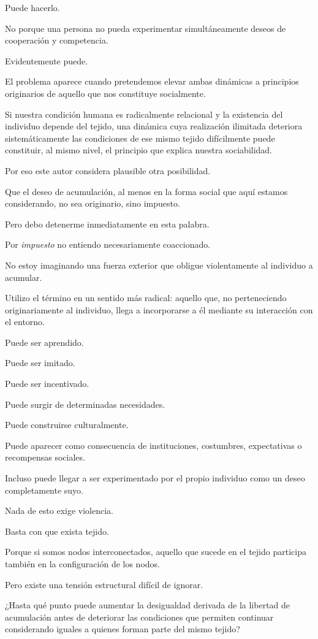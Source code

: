 \documentclass[12pt,a4paper]{article}
\begin{document}
Puede hacerlo.

No porque una persona no pueda experimentar simultáneamente deseos de cooperación y competencia.

Evidentemente puede.

El problema aparece cuando pretendemos elevar ambas dinámicas a principios originarios de aquello que nos constituye socialmente.

Si nuestra condición humana es radicalmente relacional y la existencia del individuo depende del tejido, una dinámica cuya realización ilimitada deteriora sistemáticamente las condiciones de ese mismo tejido difícilmente puede constituir, al mismo nivel, el principio que explica nuestra sociabilidad.

Por eso este autor considera plausible otra posibilidad.

Que el deseo de acumulación, al menos en la forma social que aquí estamos considerando, no sea originario, sino impuesto.

Pero debo detenerme inmediatamente en esta palabra.

Por \emph{impuesto} no entiendo necesariamente coaccionado.

No estoy imaginando una fuerza exterior que obligue violentamente al individuo a acumular.

Utilizo el término en un sentido más radical: aquello que, no perteneciendo originariamente al individuo, llega a incorporarse a él mediante su interacción con el entorno.

Puede ser aprendido.

Puede ser imitado.

Puede ser incentivado.

Puede surgir de determinadas necesidades.

Puede construirse culturalmente.

Puede aparecer como consecuencia de instituciones, costumbres, expectativas o recompensas sociales.

Incluso puede llegar a ser experimentado por el propio individuo como un deseo completamente suyo.

Nada de esto exige violencia.

Basta con que exista tejido.

Porque si somos nodos interconectados, aquello que sucede en el tejido participa también en la configuración de los nodos.

Pero existe una tensión estructural difícil de ignorar.

¿Hasta qué punto puede aumentar la desigualdad derivada de la libertad de acumulación antes de deteriorar las condiciones que permiten continuar considerando iguales a quienes forman parte del mismo tejido?
\end{document}
